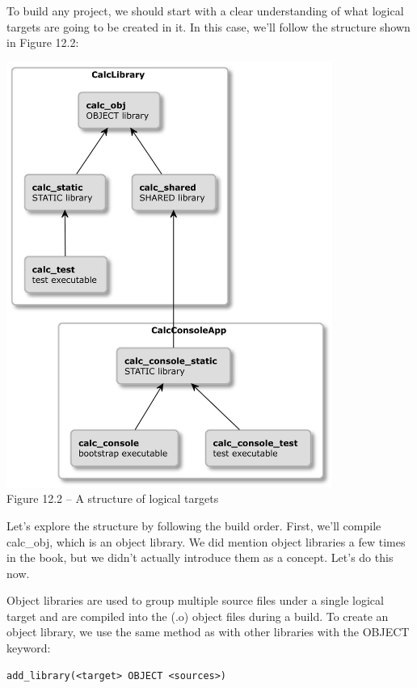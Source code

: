 
To build any project, we should start with a clear understanding of what logical targets are going to be created in it. In this case, we'll follow the structure shown in Figure 12.2:

\begin{center}
\includegraphics[width=0.8\textwidth]{content/3/chapter12/images/2.jpg}\\
Figure 12.2 – A structure of logical targets
\end{center}

Let's explore the structure by following the build order. First, we'll compile calc\_obj, which is an object library. We did mention object libraries a few times in the book, but we didn't actually introduce them as a concept. Let's do this now.


Object libraries are used to group multiple source files under a single logical target and are compiled into the (.o) object files during a build. To create an object library, we use the same method as with other libraries with the OBJECT keyword:

\begin{lstlisting}[style=styleCMake]
add_library(<target> OBJECT <sources>)
\end{lstlisting}

